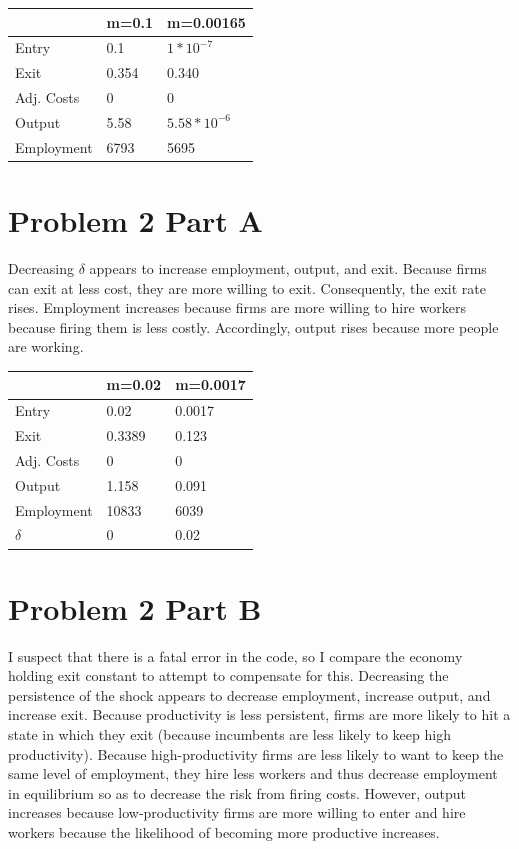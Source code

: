 \documentclass[12pt, letterpaper, parskip = full]{article}
\begin{document}
  \begin{table}[]
  \begin{tabular}{|l|l|l|}
  \hline
             & m=0.1 & m=0.00165                   \\ \hline
  Entry      & 0.1   & $1*10^{-7}$    \\ \hline
  Exit       & 0.354 & 0.340                       \\ \hline
  Adj. Costs & 0     & 0                           \\ \hline
  Output     & 5.58  & $5.58*10^{-6}$ \\ \hline
  Employment & 6793  & 5695                        \\ \hline
  \end{tabular}
  \end{table}

  \section{Problem 2 Part A}

  Decreasing $\delta$ appears to increase employment, output, and exit. Because firms can exit at less cost, they are more willing to exit. Consequently, the exit rate rises. Employment increases because firms are more willing to hire workers because firing them is less costly. Accordingly, output rises because more people are working.

  \begin{table}[]
  \begin{tabular}{|l|l|l|}
  \hline
             & m=0.02 & m=0.0017 \\ \hline
  Entry      & 0.02   & 0.0017   \\ \hline
  Exit       & 0.3389 & 0.123    \\ \hline
  Adj. Costs & 0      & 0        \\ \hline
  Output     & 1.158  & 0.091    \\ \hline
  Employment & 10833  & 6039     \\ \hline
  $\delta$      & 0      & 0.02     \\ \hline
  \end{tabular}
  \end{table}

  \section{Problem 2 Part B}

  I suspect that there is a fatal error in the code, so I compare the economy holding exit constant to attempt to compensate for this. Decreasing the persistence of the shock appears to decrease employment, increase output, and increase exit. Because productivity is less persistent, firms are more likely to hit a state in which they exit (because incumbents are less likely to keep high productivity). Because high-productivity firms are less likely to want to keep the same level of employment, they hire less workers and thus decrease employment in equilibrium so as to decrease the risk from firing costs. However, output increases because low-productivity firms are more willing to enter and hire workers because the likelihood of becoming more productive increases.
\end{document}

